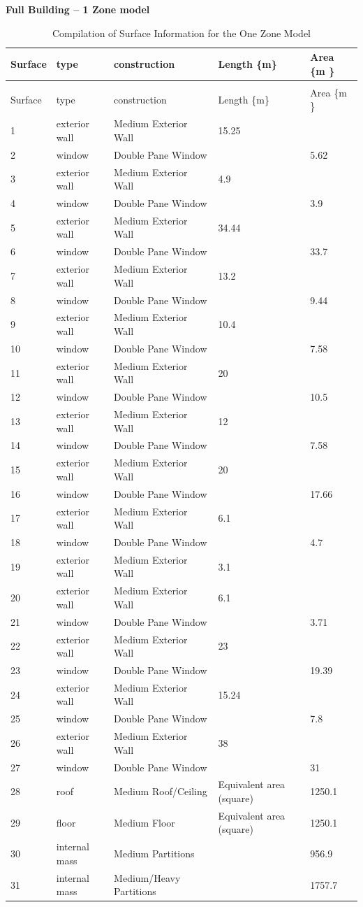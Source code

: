 \textbf{Full Building -- 1 Zone model}

\begin{longtable}[c]{p{1.2in}p{1.2in}p{1.2in}p{1.2in}p{1.2in}}
\caption{Compilation of Surface Information for the One Zone Model \label{table:compilation-of-surface-information-for}} \tabularnewline
\toprule 
Surface & type & construction & Length \{m\} & Area \{m  \} \tabularnewline
\midrule
\endfirsthead

\caption[]{Compilation of Surface Information for the One Zone Model} \tabularnewline
\toprule 
Surface & type & construction & Length \{m\} & Area \{m  \} \tabularnewline
\midrule
\endhead

1 & exterior wall & Medium Exterior Wall & 15.25 & ~ \tabularnewline
2 & window & Double Pane Window & ~ & 5.62 \tabularnewline
3 & exterior wall & Medium Exterior Wall & 4.9 & ~ \tabularnewline
4 & window & Double Pane Window & ~ & 3.9 \tabularnewline
5 & exterior wall & Medium Exterior Wall & 34.44 & ~ \tabularnewline
6 & window & Double Pane Window & ~ & 33.7 \tabularnewline
7 & exterior wall & Medium Exterior Wall & 13.2 & ~ \tabularnewline
8 & window & Double Pane Window & ~ & 9.44 \tabularnewline
9 & exterior wall & Medium Exterior Wall & 10.4 & ~ \tabularnewline
10 & window & Double Pane Window & ~ & 7.58 \tabularnewline
11 & exterior wall & Medium Exterior Wall & 20 & ~ \tabularnewline
12 & window & Double Pane Window & ~ & 10.5 \tabularnewline
13 & exterior wall & Medium Exterior Wall & 12 & ~ \tabularnewline
14 & window & Double Pane Window & ~ & 7.58 \tabularnewline
15 & exterior wall & Medium Exterior Wall & 20 & ~ \tabularnewline
16 & window & Double Pane Window & ~ & 17.66 \tabularnewline
17 & exterior wall & Medium Exterior Wall & 6.1 & ~ \tabularnewline
18 & window & Double Pane Window & ~ & 4.7 \tabularnewline
19 & exterior wall & Medium Exterior Wall & 3.1 & ~ \tabularnewline
20 & exterior wall & Medium Exterior Wall & 6.1 & ~ \tabularnewline
21 & window & Double Pane Window & ~ & 3.71 \tabularnewline
22 & exterior wall & Medium Exterior Wall & 23 & ~ \tabularnewline
23 & window & Double Pane Window & ~ & 19.39 \tabularnewline
24 & exterior wall & Medium Exterior Wall & 15.24 & ~ \tabularnewline
25 & window & Double Pane Window & ~ & 7.8 \tabularnewline
26 & exterior wall & Medium Exterior Wall & 38 & ~ \tabularnewline
27 & window & Double Pane Window & ~ & 31 \tabularnewline
28 & roof & Medium Roof/Ceiling & Equivalent area (square) & 1250.1 \tabularnewline
29 & floor & Medium Floor & Equivalent area (square) & 1250.1 \tabularnewline
30 & internal mass & Medium Partitions & ~ & 956.9 \tabularnewline
31 & internal mass & Medium/Heavy Partitions & ~ & 1757.7 \tabularnewline
\bottomrule
\end{longtable}

